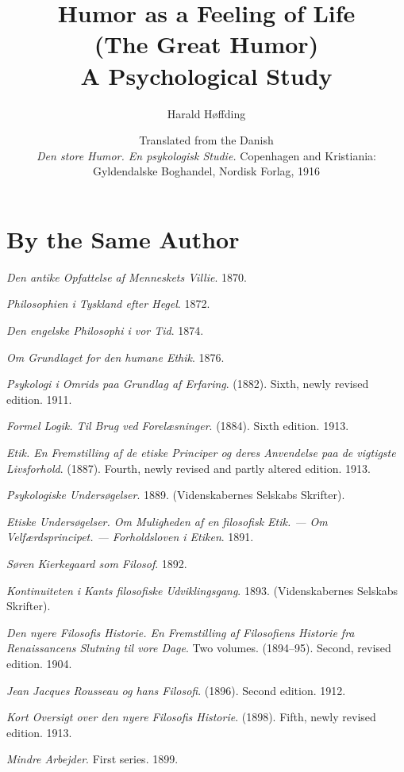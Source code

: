 \documentclass[12pt]{book}
\title{Humor as a Feeling of Life\\[0.4em]
  \large (The Great Humor)\\[0.2em]
  A Psychological Study}
\author{Harald Høffding}
\date{Translated from the Danish\\[0.6em]
  \small \textit{Den store Humor. En psykologisk Studie.} Copenhagen and
  Kristiania: Gyldendalske Boghandel, Nordisk Forlag, 1916}
\begin{document}
\frontmatter
\maketitle

\chapter*{By the Same Author}
{\small\setlength{\parindent}{0pt}\setlength{\parskip}{0.2em}
\everypar{\hangindent=2em}
\textit{Den antike Opfattelse af Menneskets Villie}. 1870.\par
\textit{Philosophien i Tyskland efter Hegel}. 1872.\par
\textit{Den engelske Philosophi i vor Tid}. 1874.\par
\textit{Om Grundlaget for den humane Ethik}. 1876.\par
\textit{Psykologi i Omrids paa Grundlag af Erfaring}. (1882). Sixth, newly revised edition. 1911.\par
\textit{Formel Logik. Til Brug ved Forelæsninger}. (1884). Sixth edition. 1913.\par
\textit{Etik. En Fremstilling af de etiske Principer og deres Anvendelse paa de vigtigste Livsforhold}. (1887). Fourth, newly revised and partly altered edition. 1913.\par
\textit{Psykologiske Undersøgelser}. 1889. (Videnskabernes Selskabs Skrifter).\par
\textit{Etiske Undersøgelser. Om Muligheden af en filosofisk Etik. --- Om Velfærdsprincipet. --- Forholdsloven i Etiken}. 1891.\par
\textit{Søren Kierkegaard som Filosof}. 1892.\par
\textit{Kontinuiteten i Kants filosofiske Udviklingsgang}. 1893. (Videnskabernes Selskabs Skrifter).\par
\textit{Den nyere Filosofis Historie. En Fremstilling af Filosofiens Historie fra Renaissancens Slutning til vore Dage}. Two volumes. (1894--95). Second, revised edition. 1904.\par
\textit{Jean Jacques Rousseau og hans Filosofi}. (1896). Second edition. 1912.\par
\textit{Kort Oversigt over den nyere Filosofis Historie}. (1898). Fifth, newly revised edition. 1913.\par
\textit{Mindre Arbejder}. First series. 1899.\par
}
\end{document}
